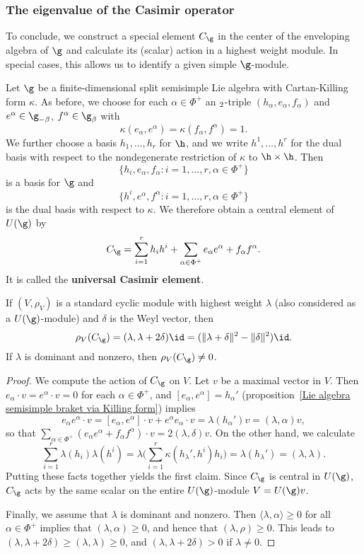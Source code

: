 \subsubsection{The eigenvalue of the Casimir operator}
To conclude, we construct a special element $C_\g$ in the center of the enveloping algebra of $\g$ and calculate its (scalar) action in a highest weight module. In special cases, this allows us to identify a given simple $\g$-module.\par
Let $\g$ be a finite-dimensional split semisimple Lie algebra with Cartan-Killing form $\kappa$. As before, we choose for each $\alpha\in\Phi^+$ an $\sl_2$-triple $(h_\alpha,e_\alpha,f_\alpha)$ and $e^\alpha\in\g_{-\beta}$, $f^\alpha\in\g_\beta$ with
\[\kappa(e_\alpha,e^\alpha)=\kappa(f_\alpha,f^\alpha)=1.\]
We further choose a basis $h_1,\dots,h_r$ for $\h$, and we write $h^1,\dots,h^r$ for the dual basis with respect to the nondegenerate restriction of $\kappa$ to $\h\times\h$. Then
\[\{h_i,e_\alpha,f_\alpha:i=1,\dots,r,\alpha\in\Phi^+\}\]
is a basis for $\g$ and
\[\{h^i,e^\alpha,f^\alpha:i=1,\dots,r,\alpha\in\Phi^+\}\]
is the dual basis with respect to $\kappa$. We therefore obtain a central element of $U(\g)$ by
\[C_\g=\sum_{i=1}^{r}h_ih^i+\sum_{\alpha\in\Phi^+}e_\alpha e^\alpha+f_\alpha f^\alpha.\]
It is called the \textbf{universal Casimir element}.
\begin{proposition}\label{Lie algebra universal Casimir element}
If $(V,\rho_V)$ is a standard cyclic module with highest weight $\lambda$ (also considered as a $U(\g)$-module) and $\delta$ is the Weyl vector, then
\[\rho_V(C_\g)=(\lambda,\lambda+2\delta)\id=(\|\lambda+\delta\|^2-\|\delta\|^2)\id.\]
If $\lambda$ is dominant and nonzero, then $\rho_V(C_\g)\neq 0$.
\end{proposition}
\begin{proof}
We compute the action of $C_\g$ on $V$. Let $v$ be a maximal vector in $V$. Then $e_\alpha\cdot v=e^\alpha\cdot v=0$ for each $\alpha\in\Phi^+$, and $[e_\alpha,e^\alpha]=h_\alpha'$ (proposition~\ref{Lie algebra semisimple braket via Killing form}) implies
\[e_\alpha e^\alpha\cdot v=[e_\alpha,e^\alpha]\cdot v+e^\alpha e_\alpha\cdot v=\lambda(h_\alpha')v=(\lambda,\alpha)v,\]
so that $\sum_{\alpha\in\Phi^+}(e_\alpha e^\alpha+f_\alpha f^\alpha)\cdot v=2(\lambda,\delta)v$. On the other hand, we calculate
\[\sum_{i=1}^{r}\lambda(h_i)\lambda(h^i)=\lambda\Big(\sum_{i=1}^{r}\kappa(h_\lambda',h^i)h_i\Big)=\lambda(h_\lambda')=(\lambda,\lambda).\]
Putting these facts together yields the first claim. Since $C_\g$ is central in $U(\g)$, $C_\g$ acts by the same scalar on the entire $U(\g)$-module $V=U(\g)v$.\par
Finally, we assume that $\lambda$ is dominant and nonzero. Then $\langle\lambda,\alpha\rangle\geq 0$ for all $\alpha\in\Phi^+$ implies that $(\lambda,\alpha)\geq 0$, and hence that $(\lambda,\rho)\geq 0$. This leads to $(\lambda,\lambda+2\delta)\geq(\lambda,\lambda)\geq 0$, and $(\lambda,\lambda+2\delta)>0$ if $\lambda\neq 0$.
\end{proof}
